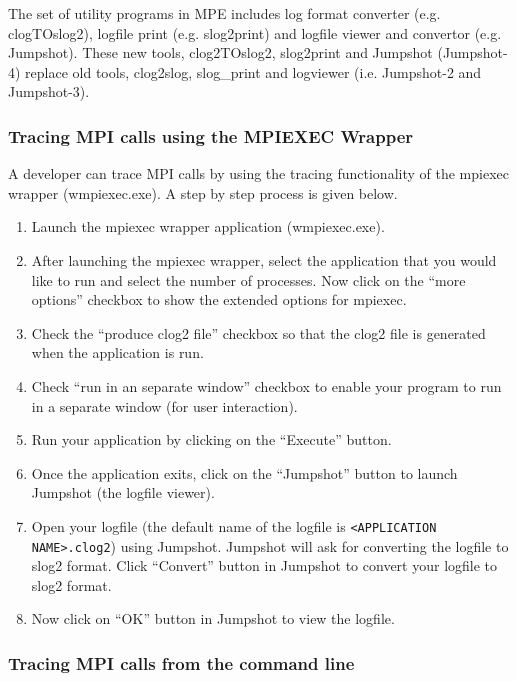 \documentclass[dvipdfm,11pt]{article}
\begin{document}
The set of utility programs in MPE includes log format converter (e.g.
clogTOslog2), logfile print (e.g. slog2print) and logfile viewer and
convertor (e.g. Jumpshot).  These new tools, clog2TOslog2, slog2print and
Jumpshot (Jumpshot-4) replace old tools, clog2slog, slog\_print and logviewer
(i.e. Jumpshot-2 and Jumpshot-3).  

\subsubsection{Tracing MPI calls using the MPIEXEC Wrapper}
A developer can trace MPI calls by using the tracing functionality of the mpiexec
wrapper (wmpiexec.exe). A step by step process is given below. 

\begin{enumerate}
	\item Launch the mpiexec wrapper application (wmpiexec.exe).
	
	\item After launching the mpiexec wrapper, select the application that you would
			like to run and select the number of
			processes. Now click on the ``more options''
			checkbox to show the extended options for mpiexec.

	\item Check the ``produce clog2 file'' checkbox so that the clog2 file is generated 
			when the application is run.

	\item Check ``run in an separate window'' checkbox to enable your program to run in
			a separate window (for user interaction).

	\item Run your application by clicking on the ``Execute'' button.
	
	\item Once the application exits, click on the ``Jumpshot'' button to launch Jumpshot 
			(the logfile viewer). 

	\item Open your logfile (the default name of the logfile is \texttt{<APPLICATION NAME>.clog2}) 
			using Jumpshot. Jumpshot will ask for converting the logfile to slog2 format.
			Click ``Convert'' button in Jumpshot to convert your logfile to slog2 format.

	\item Now click on ``OK'' button in Jumpshot to view the logfile.
\end{enumerate}

\subsubsection{Tracing MPI calls from the command line}
\end{document}
